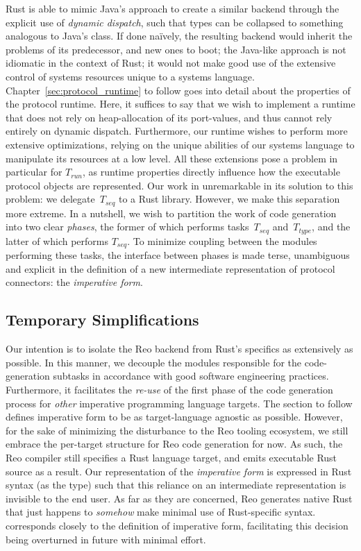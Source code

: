 Rust is able to mimic Java's approach to create a similar backend through the explicit use of \textit{dynamic dispatch}, such that types can be collapsed to something analogous to Java's  class. If done na\"ively, the resulting backend would inherit the problems of its predecessor, and new ones to boot; the Java-like approach is not idiomatic in the context of Rust; it would not make good use of the extensive control of systems resources unique to a systems language. Chapter~\ref{sec:protocol_runtime} to follow goes into detail about the properties of the protocol runtime. Here, it suffices to say that we wish to implement a runtime that does not rely on heap-allocation of its port-values, and thus cannot rely entirely on dynamic dispatch. Furthermore, our runtime wishes to perform more extensive optimizations, relying on the unique abilities of our systems language to manipulate its resources at a low level. All these extensions pose a problem in particular for $T_{run}$, as runtime properties directly influence how the executable protocol objects are represented. Our work in unremarkable in its solution to this problem: we delegate~$T_{seq}$ to a Rust library. However, we make this separation more extreme. In a nutshell, we wish to partition the work of code generation into two clear \textit{phases}, the former of which performs tasks~$T_{seq}$ and~$T_{type}$, and the latter of which performs $T_{seq}$. To minimize coupling between the modules performing these tasks, the interface between phases is made terse, unambiguous and explicit in the definition of a new intermediate representation of protocol connectors: the \textit{imperative form}.

\subsection{Temporary Simplifications}
\label{sec:temporary_simplifications}
Our intention is to isolate the Reo backend from Rust's specifics as extensively as possible. In this manner, we decouple the modules responsible for the code-generation subtasks in accordance with good software engineering practices. Furthermore, it facilitates the \textit{re-use} of the first phase of the code generation process for \textit{other} imperative programming language targets. The section to follow defines imperative form to be as target-language agnostic as possible. However, for the sake of minimizing the disturbance to the Reo tooling ecosystem, we still embrace the per-target structure for Reo code generation for now. As such, the Reo compiler still specifies a Rust language target, and emits executable Rust source as a result. Our representation of the \textit{imperative form} is expressed in Rust syntax (as the  type) such that this reliance on an intermediate representation is invisible to the end user. As far as they are concerned, Reo generates native Rust that just happens to \textit{somehow} make minimal use of Rust-specific syntax.  corresponds closely to the definition of imperative form, facilitating this decision being overturned in future with minimal effort.


